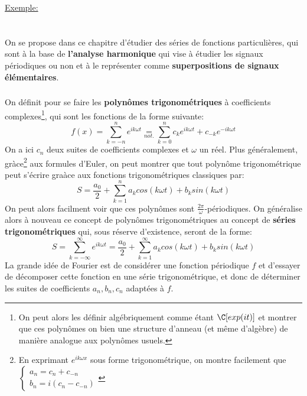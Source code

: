 \uline{Exemple:}

\chapter*{}
On se propose dans ce chapitre d'étudier des séries de fonctions particulières, qui sont à la base de \textbf{l'analyse harmonique} qui vise à étudier les signaux périodiques ou non et à le représenter comme \textbf{superpositions de signaux élémentaires}.

\subsection*{}
On définit pour se faire les \textbf{polynômes trigonométriques} à coefficients complexes\footnote[1]{On peut alors les définir algébriquement comme étant \(\C[exp(it)]\) et montrer que ces polynômes on bien une structure d'anneau (et même d'algèbre) de manière analogue aux polynômes usuels.}, qui sont les fonctions de la forme suivante:
\[
   f(x) = \sum_{k=-n}^{n} e^{ik\omega t} \underset{not.}{=} \sum_{k = 0}^{n} c_k e^{ik\omega t} + c_{-k}e^{-ik\omega t}    
\]
On a ici \(c_n\) deux suites de coefficients complexes et \(\omega\) un réel. Plus généralement, gràce\footnote[2]{En exprimant \(e^{ik\omega x}\) sous forme trigonométrique, on montre facilement que \(\begin{cases} a_n = c_n + c_{-n} \\ b_n = i(c_n - c_{-n}) \end{cases}\)} aux formules d'Euler, on peut montrer que tout polynôme trigonométrique peut s'écrire graàce aux fonctions trigonométriques classiques par:
\[
   S = \frac{a_0}{2} + \sum_{k=1}^{n} a_kcos(k\omega t) + b_ksin(k\omega t)   
\]
On peut alors facilment voir que ces polynômes sont \(\frac{2\pi}{\omega}\)-périodiques. On généralise alors à nouveau ce concept de polynômes trigonométriques au concept de \textbf{séries trigonométriques} qui, sous réserve d'existence, seront de la forme:
\[
   S = \sum_{k=-\infty}^{\infty} e^{ik\omega t} = \frac{a_0}{2} + \sum_{k=1}^{\infty} a_kcos(k\omega t) + b_ksin(k\omega t)
\]
La grande idée de Fourier est de considérer une fonction périodique \(f\) et d'essayer de décomposer cette fonction en une série trigonométrique, et donc de déterminer les suites de coefficients \(a_n, b_n, c_n\) adaptées à \(f\).

